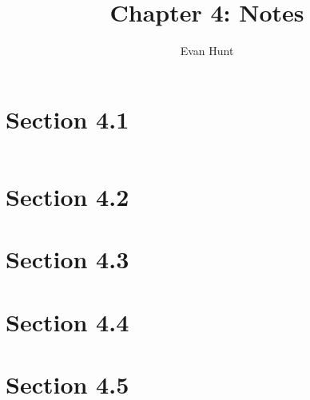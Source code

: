 \documentclass[12pt]{article}
\title{Chapter 4: Notes}
\author{Evan Hunt}
\begin{document}
    \maketitle

    \section[]{Section 4.1}
        \begin{equation}
        
        \end{equation}
    \section[]{Section 4.2}
    \section[]{Section 4.3}
    \section[]{Section 4.4}
    \section[]{Section 4.5}
\end{document}
